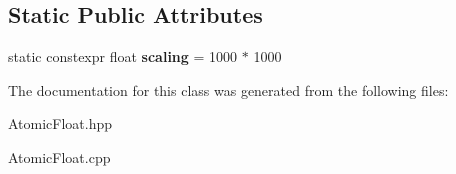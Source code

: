 \subsection*{Static Public Attributes}
\begin{DoxyCompactItemize}
\item 
\mbox{\label{classAtomicFloat_a1070b6e6618d84e7008f3a87d229420d}} 
static constexpr float {\bfseries scaling} = 1000 $\ast$ 1000
\end{DoxyCompactItemize}


The documentation for this class was generated from the following files\+:\begin{DoxyCompactItemize}
\item 
Atomic\+Float.\+hpp\item 
Atomic\+Float.\+cpp\end{DoxyCompactItemize}
